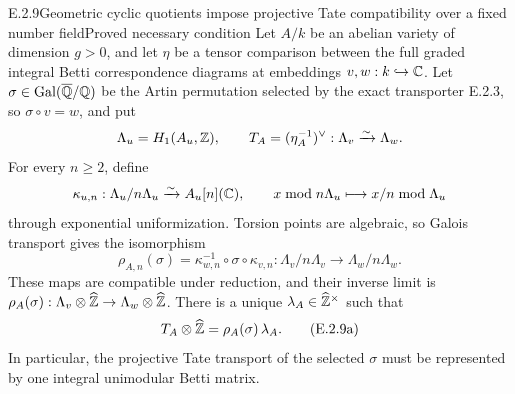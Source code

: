 \begin{result}{E.2.9}{Geometric cyclic quotients impose projective Tate compatibility over a fixed number field}{Proved necessary condition}
Let $A/k$ be an abelian variety of dimension $g>0$, and let
$\eta$ be a tensor comparison between the full graded integral Betti
correspondence diagrams at embeddings $v,w:k\hookrightarrow\mathbb C$.
Let $\sigma\in\operatorname{Gal}(\overline{\mathbb Q}/\mathbb Q)$ be the Artin permutation selected by the
exact transporter E.2.3, so $\sigma\circ v=w$, and put
\[
 \Lambda_u=H_1(A_u,\mathbb Z),\qquad
 T_A=(\eta_A^{-1})^\vee:\Lambda_v\xrightarrow{\sim}\Lambda_w.
\]
For every $n\ge2$, define
\[
 \kappa_{u,n}:\Lambda_u/n\Lambda_u\xrightarrow{\sim}A_u[n](\mathbb C),
 \qquad x\bmod n\Lambda_u\longmapsto x/n\bmod\Lambda_u
\]
through exponential uniformization. Torsion points are algebraic, so
Galois transport gives the isomorphism
\[
 \rho_{A,n}(\sigma)
   =\kappa_{w,n}^{-1}\circ\sigma\circ\kappa_{v,n}:
       \Lambda_v/n\Lambda_v\longrightarrow\Lambda_w/n\Lambda_w.
\]
These maps are compatible under reduction, and their inverse limit is
$\rho_A(\sigma):\Lambda_v\otimes\widehat{\mathbb Z}
 \to\Lambda_w\otimes\widehat{\mathbb Z}$. There is a unique
$\lambda_A\in\widehat{\mathbb Z}^\times$ such that
\[
 T_A\otimes\widehat{\mathbb Z}=\rho_A(\sigma)\,\lambda_A.
 \tag{E.2.9a}
\]
In particular, the projective Tate transport of the selected
$\sigma$ must be represented by one integral unimodular Betti matrix.
\end{result}
